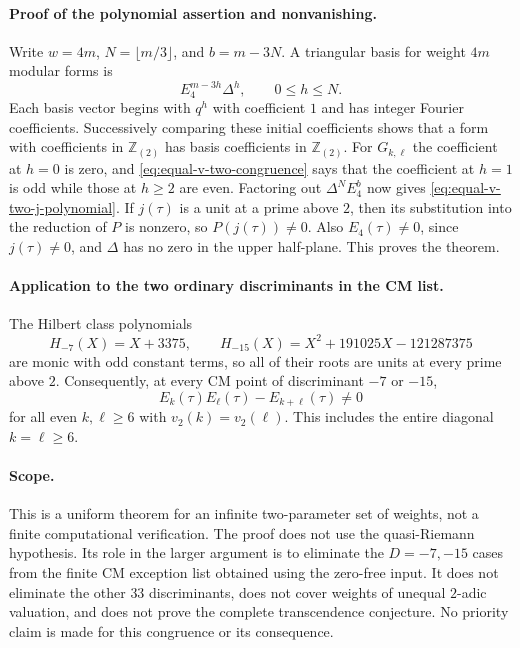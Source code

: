 \documentclass[11pt]{article}
\begin{document}
\paragraph{Proof of the polynomial assertion and nonvanishing.}
Write $w=4m$, $N=\lfloor m/3\rfloor$, and $b=m-3N$.
A triangular basis for weight $4m$ modular forms is
\[
 E_4^{m-3h}\Delta^h,\qquad 0\le h\le N.
\]
Each basis vector begins with $q^h$ with coefficient $1$ and has
integer Fourier coefficients.  Successively comparing these initial
coefficients shows that a form with coefficients in $\mathbb Z_{(2)}$
has basis coefficients in $\mathbb Z_{(2)}$.  For $G_{k,\ell}$ the
coefficient at $h=0$ is zero, and
\eqref{eq:equal-v-two-congruence} says that the coefficient at $h=1$
is odd while those at $h\ge2$ are even.  Factoring out
$\Delta^NE_4^b$ now gives
\eqref{eq:equal-v-two-j-polynomial}.  If $j(\tau)$ is a unit at a
prime above $2$, then its substitution into the reduction of $P$
is nonzero, so $P(j(\tau))\ne0$.  Also $E_4(\tau)\ne0$, since
$j(\tau)\ne0$, and $\Delta$ has no zero in the upper half-plane.
This proves the theorem.

\paragraph{Application to the two ordinary discriminants in the CM list.}
The Hilbert class polynomials
\[
 H_{-7}(X)=X+3375,\qquad
 H_{-15}(X)=X^2+191025X-121287375
\]
are monic with odd constant terms, so all of their roots are units
at every prime above $2$.  Consequently, at every CM point of
discriminant $-7$ or $-15$,
\[
 E_k(\tau)E_\ell(\tau)-E_{k+\ell}(\tau)\ne0
\]
for all even $k,\ell\ge6$ with $v_2(k)=v_2(\ell)$.  This includes
the entire diagonal $k=\ell\ge6$.

\paragraph{Scope.}
This is a uniform theorem for an infinite two-parameter set of
weights, not a finite computational verification.  The proof does
not use the quasi-Riemann hypothesis.  Its role in the larger
argument is to eliminate the $D=-7,-15$ cases from the finite CM
exception list obtained using the zero-free input.  It does not
eliminate the other $33$ discriminants, does not cover weights of
unequal $2$-adic valuation, and does not prove the complete
transcendence conjecture.  No priority claim is made for this
congruence or its consequence.
\end{document}
